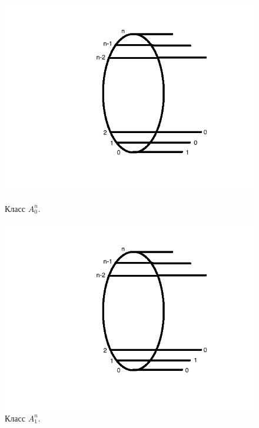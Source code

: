 \documentclass[oneside, final, 14pt]{extreport}
\begin{document}
 \begin{figure}[h]
 	\begin{center}
 		\begin{minipage}[h]{0.3\linewidth}
 			\includegraphics[width=1\linewidth]{A0}
 			\caption{Класс $A_0^n$.} %
 			\label{ris:A0} %
 		\end{minipage}
 		\hfill 
 		\begin{minipage}[h]{0.3\linewidth}
 			\includegraphics[width=1\linewidth]{A1}
 			\caption{Класс $A_1^n$.}
 			\label{ris:A1}
 		\end{minipage}
 		\hfill 
 		\begin{minipage}[h]{0.3\linewidth}

\end{minipage}
\end{center}
\end{figure}
\end{document}
